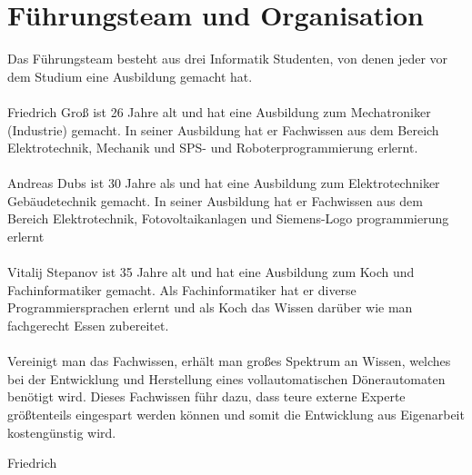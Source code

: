 
\section{Führungsteam und Organisation}
Das Führungsteam besteht aus drei Informatik Studenten, von denen jeder vor dem Studium eine Ausbildung gemacht hat.
\\\\
Friedrich Groß ist 26 Jahre alt und hat eine Ausbildung zum Mechatroniker (Industrie) gemacht.
In seiner Ausbildung hat er Fachwissen aus dem Bereich Elektrotechnik, Mechanik und SPS- und Roboterprogrammierung erlernt.
\\\\
Andreas Dubs ist 30 Jahre als und hat eine Ausbildung zum Elektrotechniker Gebäudetechnik gemacht.
In seiner Ausbildung hat er Fachwissen aus dem Bereich Elektrotechnik, Fotovoltaikanlagen und Siemens-Logo programmierung erlernt
\\\\
Vitalij Stepanov ist 35 Jahre alt und hat eine Ausbildung zum Koch und Fachinformatiker gemacht.
Als Fachinformatiker hat er diverse Programmiersprachen erlernt und als Koch das Wissen darüber wie man fachgerecht Essen zubereitet.
\\\\
Vereinigt man das Fachwissen, erhält man großes Spektrum an Wissen, welches bei der Entwicklung und Herstellung eines
vollautomatischen Dönerautomaten benötigt wird. Dieses Fachwissen führ dazu, dass teure externe Experte größtenteils
eingespart werden können und somit die Entwicklung aus Eigenarbeit kostengünstig wird.


Friedrich